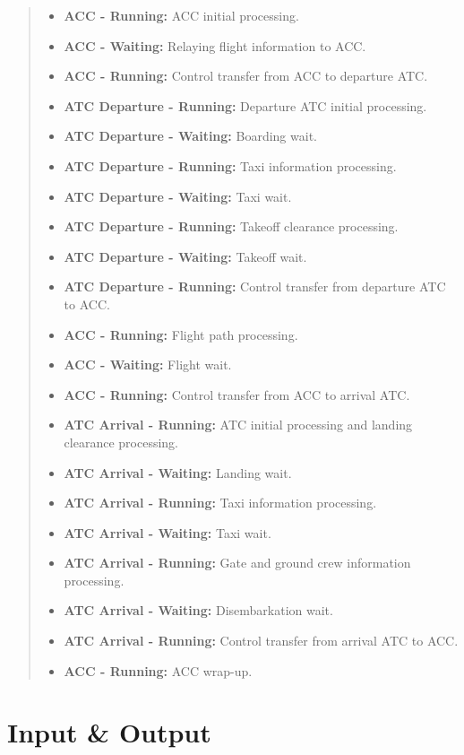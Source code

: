 \documentclass[10pt]{article}
\begin{document}
\begin{quote}
\begin{itemize}
    \item[] \textbf{ACC - Running: } ACC initial processing.
    \item[] \textbf{ACC - Waiting: } Relaying flight information to ACC.
    \item[] \textbf{ACC - Running: } Control transfer from ACC to departure ATC. 
    \item[] \textbf{ATC Departure - Running: } Departure ATC initial processing. 
    \item[] \textbf{ATC Departure - Waiting: } Boarding wait.
    \item[] \textbf{ATC Departure - Running: } Taxi information processing.
    \item[] \textbf{ATC Departure - Waiting: } Taxi wait.
    \item[] \textbf{ATC Departure - Running: } Takeoff clearance processing.
    \item[] \textbf{ATC Departure - Waiting: } Takeoff wait.
    \item[] \textbf{ATC Departure - Running: } Control transfer from departure ATC to ACC.
    \item[] \textbf{ACC - Running: } Flight path processing.
    \item[] \textbf{ACC - Waiting: } Flight wait.
    \item[] \textbf{ACC - Running: } Control transfer from ACC to arrival ATC. 
    \item[] \textbf{ATC Arrival - Running: } ATC initial processing and landing clearance processing. 
    \item[] \textbf{ATC Arrival - Waiting: } Landing wait.
    \item[] \textbf{ATC Arrival - Running: } Taxi information processing.
    \item[] \textbf{ATC Arrival - Waiting: } Taxi wait.
    \item[] \textbf{ATC Arrival - Running: } Gate and ground crew information processing.
    \item[] \textbf{ATC Arrival - Waiting: } Disembarkation wait. 
    \item[] \textbf{ATC Arrival - Running: } Control transfer from arrival ATC to ACC.
    \item[] \textbf{ACC - Running: } ACC wrap-up. 
\end{itemize}

\end{quote}


\section{Input \& Output}
\end{document}
